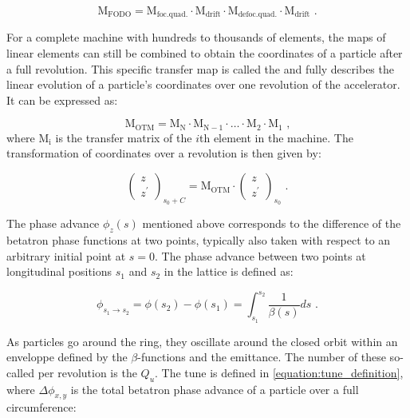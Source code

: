 \begin{equation}
    \mathrm{M_{FODO}} = \mathrm{M_{foc. quad.}} \cdot \mathrm{M_{drift}} \cdot \mathrm{M_{defoc. quad.}} \cdot \mathrm{M_{drift}} \text{ .}
    \label{equation:fodo_transfer_matrix}
\end{equation}

For a complete machine with hundreds to thousands of elements, the maps of linear elements can still be combined to obtain the coordinates of a particle after a full revolution.
This specific transfer map is called the  and fully describes the linear evolution of a particle's coordinates over one revolution of the accelerator.
It can be expressed as:

\begin{equation}
    \mathrm{M_{OTM}} = \mathrm{M_N} \cdot \mathrm{M_{N-1}} \cdot \ldots \cdot \mathrm{M_2} \cdot \mathrm{M_1} \text{ ,}
    \label{equation:one_turn_map}
\end{equation}
where \(\mathrm{M_i}\) is the transfer matrix of the \(i\)th element in the machine.
The transformation of coordinates over a revolution is then given by:

\begin{equation}
    \left(
        \begin{array}{c}
            z \\
            z^{\prime}
        \end{array} \right)_{s_0 + C} = \mathrm{M_{OTM}} \cdot \left( 
        \begin{array}{c}
            z \\
            z^{\prime}
    \end{array} \right)_{s_0} \text{ .}
    \label{equation:one_turn_coordinates_transformation}
\end{equation}

The phase advance \(\phi_z(s)\) mentioned above corresponds to the difference of the betatron phase functions at two points, typically also taken with respect to an arbitrary initial point at \(s = 0\).
The phase advance between two points at longitudinal positions \(s_1\) and \(s_2\) in the lattice is defined as:

\begin{equation}
    \phi_{s_1 \rightarrow s_2} = \phi(s_{2}) - \phi(s_{1}) = \int_{s_{1}}^{s_{2}} \frac{1}{\beta(s)} ds \text{ .}
    \label{equation:phase_advance_definition}
\end{equation}

As particles go around the ring, they oscillate around the closed orbit within an enveloppe defined by the \(\beta\)-functions and the emittance.
The number of these so-called  per revolution is the  \(Q_u\).
The tune is defined in \cref{equation:tune_definition}, where \(\Delta \phi_{x, y}\) is the total betatron phase advance of a particle over a full circumference:

